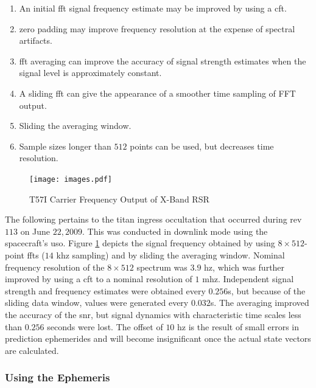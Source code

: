 \documentclass[oneside]{book}
\theoremstyle{mystyle}
\begin{document}
\begin{enumerate}[itemsep=0pt]
\item An initial \gls{fft} signal frequency estimate may be improved by using a \gls{cft}.
\item \Gls{zero padding} may improve frequency resolution at the expense of spectral artifacts.
\item \gls{fft averaging} can improve the accuracy of signal strength estimates when the signal level is approximately constant.
\item A \gls{sliding fft} can give the appearance of a smoother time sampling of FFT output. 
\item Sliding the averaging window.
\item Sample sizes longer than $512$ points can be used, but decreases time \gls{resolution}. 
\end{enumerate}

\begin{figure}
	\centering
    \vspace{-5ex}
	\texttt{[image: images.pdf]}
	\caption{T57I Carrier Frequency Output of X-Band RSR}
	\label{fig:usr_titan_atmo_occ_T57I_carrier_signal}
\end{figure}

The following pertains to the \gls{titan} \gls{ingress} \gls{occultation} that occurred during \gls{rev} $113$ on June $22, 2009$. This was conducted in  \gls{downlink} mode using the spacecraft's \gls{uso}. Figure \ref{fig:usr_titan_atmo_occ_T57I_carrier_signal} depicts the signal frequency obtained by using $8\times 512$-point \glspl{fft} ($14$ \gls{khz} sampling) and by sliding the averaging window. Nominal \gls{frequency} \gls{resolution} of the $8\times 512$ spectrum was $3.9$ \gls{hz}, which was further improved by using a \gls{cft} to a nominal \gls{resolution} of $1$ \gls{mhz}. Independent signal strength and \gls{frequency} estimates were obtained every $0.256$s, but because of the sliding data window, values were generated every $0.032$s. The averaging improved the accuracy of the \gls{snr}, but signal dynamics with characteristic time scales less than $0.256$ seconds were lost. The offset of $10$ \gls{hz} is the result of small errors in prediction ephemerides and will become insignificant once the actual state vectors are calculated.

\subsubsection{\footnotesize Using the Ephemeris}
\end{document}
